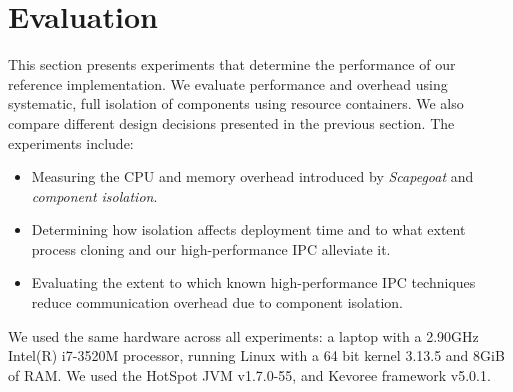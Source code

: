 \section{Evaluation} \label{sec:squirrel-evaluation}


This section presents experiments that determine the performance of our reference implementation.
We evaluate performance and overhead using systematic, full isolation of components using resource containers.
We also compare different design decisions presented in the previous section.
The experiments include:
\begin{itemize}
 \item Measuring the CPU and memory overhead introduced by \textit{Scapegoat} and \textit{component isolation}.
 \item Determining how isolation affects deployment time and to what extent process cloning and our high-performance IPC alleviate it.
 \item Evaluating the extent to which known high-performance IPC techniques reduce communication overhead due to component isolation.
\end{itemize}


We used the same hardware across all experiments: a laptop with a 2.90GHz Intel(R) i7-3520M processor, running Linux with a 64 bit kernel 3.13.5 and 8GiB of RAM.
We used the HotSpot JVM v1.7.0-55, and Kevoree framework v5.0.1.

